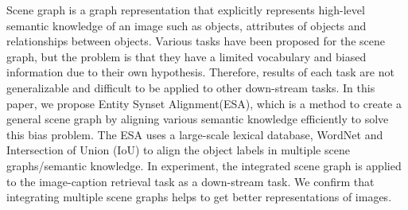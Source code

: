 Scene graph is a graph representation that explicitly represents high-level semantic knowledge of an image such as objects, attributes of objects and relationships between objects. Various tasks have been proposed for the scene graph, but the problem is that they have a limited vocabulary and biased information due to their own hypothesis. Therefore, results of each task are not generalizable and difficult to be applied to other down-stream tasks. In this paper, we propose Entity Synset Alignment(ESA), which is a method to create a general scene graph by aligning various semantic knowledge efficiently to solve this bias problem. The ESA uses a large-scale lexical database, WordNet and Intersection of Union (IoU) to align the object labels in multiple scene graphs/semantic knowledge. In experiment, the integrated scene graph is applied to the image-caption retrieval task as a down-stream task. We confirm that integrating multiple scene graphs helps to get better representations of images.
